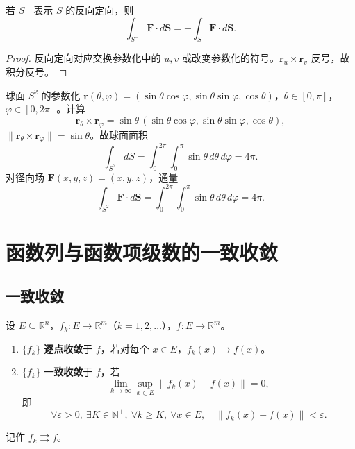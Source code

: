 \begin{proposition}[通量积分与定向的关系]\label{prop:flux_orientation}
若 $S^-$ 表示 $S$ 的反向定向，则
\[
\int_{S^-} \mathbf{F} \cdot d\mathbf{S} = -\int_S \mathbf{F} \cdot d\mathbf{S}.
\]
\end{proposition}

\begin{proof}
反向定向对应交换参数化中的 $u, v$ 或改变参数化的符号。$\mathbf{r}_u \times \mathbf{r}_v$ 反号，故积分反号。
\end{proof}

\begin{example}[球面的面积与通量]\label{ex:sphere_surface}
球面 $S^2$ 的参数化 $\mathbf{r}(\theta, \varphi) = (\sin\theta \cos\varphi, \sin\theta \sin\varphi, \cos\theta)$，$\theta \in [0, \pi]$，$\varphi \in [0, 2\pi]$。计算
\[
\mathbf{r}_\theta \times \mathbf{r}_\varphi = \sin\theta \, (\sin\theta \cos\varphi, \sin\theta \sin\varphi, \cos\theta),
\]
$\|\mathbf{r}_\theta \times \mathbf{r}_\varphi\| = \sin\theta$。故球面面积
\[
\int_{S^2} dS = \int_0^{2\pi} \int_0^{\pi} \sin\theta \, d\theta \, d\varphi = 4\pi.
\]
对径向场 $\mathbf{F}(x, y, z) = (x, y, z)$，通量
\[
\int_{S^2} \mathbf{F} \cdot d\mathbf{S} = \int_0^{2\pi} \int_0^{\pi} \sin\theta \, d\theta \, d\varphi = 4\pi.
\]
\end{example}

\section{函数列与函数项级数的一致收敛}

\subsection{一致收敛}

\begin{definition}[函数列的一致收敛]\label{def:uniform_convergence}
设 $E \subseteq \mathbb{R}^n$，$f_k: E \to \mathbb{R}^m$（$k = 1, 2, \dots$），$f: E \to \mathbb{R}^m$。
\begin{enumerate}[label=(\roman*)]
    \item $\{f_k\}$ \textbf{逐点收敛}于 $f$，若对每个 $x \in E$，$f_k(x) \to f(x)$。
    \item $\{f_k\}$ \textbf{一致收敛}于 $f$，若
    \[
    \lim_{k \to \infty} \sup_{x \in E} \|f_k(x) - f(x)\| = 0,
    \]
    即
    \[
    \forall \varepsilon > 0,\ \exists K \in \mathbb{N}^+,\ \forall k \ge K,\ \forall x \in E,\quad \|f_k(x) - f(x)\| < \varepsilon.
    \]
\end{enumerate}
记作 $f_k \rightrightarrows f$。
\end{definition}

